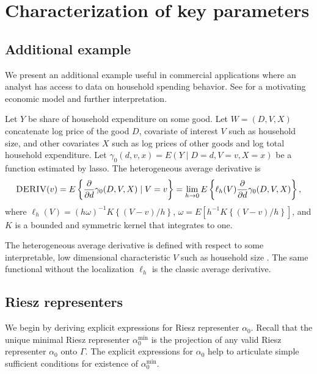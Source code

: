 \section{Characterization of key parameters}\label{sec:localization}

\subsection{Additional example}

We present an additional example useful in commercial applications where an analyst has access to data on household spending behavior. See \cite{chernozhukov2019demand} for a motivating economic model and further interpretation.

\begin{example}\label{ex:deriv}
Let $Y$ be share of household expenditure on some good. Let $W=(D,V,X)$ concatenate log price of the good $D$, covariate of interest $V$ such as household size, and other covariates $X$ such as log prices of other goods and log total household expenditure. Let $\gamma_0(d,v,x)=E(Y \mid D=d,V=v,X=x)$ be a function estimated by lasso. The heterogeneous average derivative is
$$
\textsc{DERIV}(v)=E\left\{\frac{\partial }{\partial d} \gamma_0(D,V,X) \mid V=v\right\}=\lim_{h\rightarrow 0}E\left\{\ell_h(V)\frac{\partial }{\partial d} \gamma_0(D,V,X)\right\},$$
where
$
\ell_h(V)=(h\omega)^{-1}K\left\{(V-v)/h\right\}$, $\omega=E [h^{-1} K\left\{(V-v)/h\right\}]
$, and $K$ is a bounded and symmetric kernel that integrates to one.
\end{example}
The heterogeneous average derivative is defined with respect to some interpretable, low dimensional characteristic $V$ such as household size \cite{abrevaya2015estimating}. The same functional without the localization $\ell_h$ is the classic average derivative. 

\subsection{Riesz representers}

We begin by deriving explicit expressions for Riesz representer $\alpha_0$. Recall that the unique minimal Riesz representer $\alpha_0^{\min}$ is the projection of any valid Riesz representer $\alpha_0$ onto $\Gamma$. The explicit expressions for $\alpha_0$ help to articulate simple sufficient conditions for existence of $\alpha_0^{\min}$.

